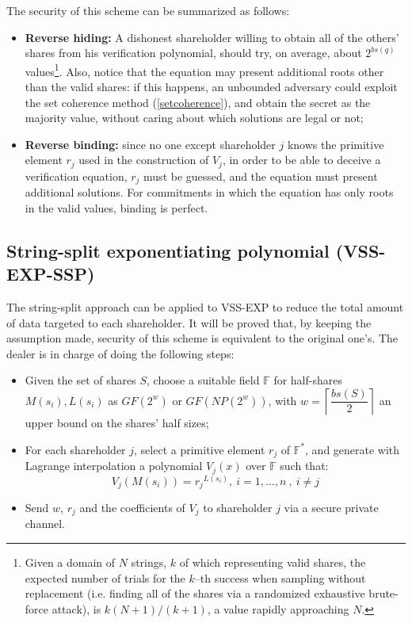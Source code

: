 \documentclass[10pt,journal,cspaper,compsoc]{IEEEtran}
\begin{document}
The security of this scheme can be summarized as follows:
\begin{itemize}
\item \textbf{Reverse hiding:} A dishonest shareholder willing to obtain all of the others' shares from his verification polynomial, should try, on average, about $2^{bs(q)}$ values\footnote{Given a domain of $N$ strings, $k$ of which representing valid shares, the expected number of trials for the $k$--th success when sampling without replacement (i.e. finding all of the shares via a randomized exhaustive brute-force attack), is $k(N+1)/(k+1)$, a value rapidly approaching $N$.}.
Also, notice that the equation may present additional roots other than the valid shares: if this happens, an unbounded adversary could exploit the set coherence method (\ref{setcoherence}), and obtain the secret as the majority value, without caring about which solutions are legal or not;
\item \textbf{Reverse binding:} since no one except shareholder $j$ knows the primitive element $r_j$ used in the construction of $V_j$, in order to be able to deceive a verification equation, $r_j$ must be guessed, and the equation must present additional solutions. For commitments in which the equation has only roots in the valid values, binding is perfect.
\end{itemize}

\subsection{String-split exponentiating polynomial (VSS-EXP-SSP)}
The string-split approach can be applied to VSS-EXP to reduce the total amount of data targeted to each shareholder. It will be proved that, by keeping the assumption made, security of this scheme is equivalent to the original one's. The dealer is in charge of doing the following steps:

\begin{itemize}
\item Given the set of shares $S$, choose a suitable field $\mathbb{F}$ for half-shares $M(s_i),L(s_i)$ as $GF(2^w)$ or $GF(NP(2^w))$, with $w = \left \lceil \dfrac{bs(S)}{2} \right \rceil$ an upper bound on the shares' half sizes;
\item For each shareholder $j$, select a primitive element $r_j$ of $\mathbb{F}^*$, and generate with Lagrange interpolation a polynomial $V_j(x)$ over $\mathbb{F}$ such that:
\begin{equation}
\label{vss-exp-ssp-verification}
V_j(M(s_i)) = {r_j}^{L(s_i)},~i=1,\ldots,n~,~i \neq j
\end{equation}
\item Send $w$, $r_j$ and the coefficients of $V_j$ to shareholder $j$ via a secure private channel.
\end{itemize}
\end{document}
